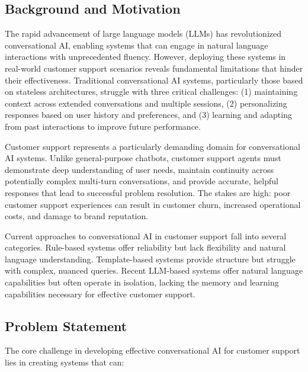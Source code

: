 \documentclass[11pt]{article}
\begin{document}
\subsection{Background and Motivation}

The rapid advancement of large language models (LLMs) has revolutionized conversational AI, enabling systems that can engage in natural language interactions with unprecedented fluency. However, deploying these systems in real-world customer support scenarios reveals fundamental limitations that hinder their effectiveness. Traditional conversational AI systems, particularly those based on stateless architectures, struggle with three critical challenges: (1) maintaining context across extended conversations and multiple sessions, (2) personalizing responses based on user history and preferences, and (3) learning and adapting from past interactions to improve future performance.

Customer support represents a particularly demanding domain for conversational AI systems. Unlike general-purpose chatbots, customer support agents must demonstrate deep understanding of user needs, maintain continuity across potentially complex multi-turn conversations, and provide accurate, helpful responses that lead to successful problem resolution. The stakes are high: poor customer support experiences can result in customer churn, increased operational costs, and damage to brand reputation.

Current approaches to conversational AI in customer support fall into several categories. Rule-based systems offer reliability but lack flexibility and natural language understanding. Template-based systems provide structure but struggle with complex, nuanced queries. Recent LLM-based systems offer natural language capabilities but often operate in isolation, lacking the memory and learning capabilities necessary for effective customer support.

\subsection{Problem Statement}

The core challenge in developing effective conversational AI for customer support lies in creating systems that can:
\end{document}
